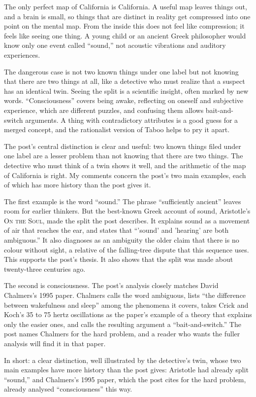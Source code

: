 \begin{afterword}
\summaryhead

The only perfect map of California is California. A useful map leaves things out, and a brain is small, so things that are distinct in reality get compressed into one point on the mental map. From the inside this does not feel like compression; it feels like seeing one thing. A young child or an ancient Greek philosopher would know only one event called ``sound,'' not acoustic vibrations and auditory experiences.

The dangerous case is not two known things under one label but not knowing that there are two things at all, like a detective who must realize that a suspect has an identical twin. Seeing the split is a scientific insight, often marked by new words. ``Consciousness'' covers being awake, reflecting on oneself and subjective experience, which are different puzzles, and confusing them allows bait-and-switch arguments. A thing with contradictory attributes is a good guess for a merged concept, and the rationalist version of Taboo helps to pry it apart.

\responsehead

The post's central distinction is clear and useful: two known things filed under one label are a lesser problem than not knowing that there are two things. The detective who must think of a twin shows it well, and the arithmetic of the map of California is right. My comments concern the post's two main examples, each of which has more history than the post gives it.

The first example is the word ``sound.'' The phrase ``sufficiently ancient'' leaves room for earlier thinkers. But the best-known Greek account of sound, Aristotle's \textsc{On the Soul}, made the split the post describes. It explains sound as a movement of air that reaches the ear, and states that ``'sound' and 'hearing' are both ambiguous.'' It also diagnoses as an ambiguity the older claim that there is no colour without sight, a relative of the falling-tree dispute that this sequence uses. This supports the post's thesis. It also shows that the split was made about twenty-three centuries ago.

The second is consciousness. The post's analysis closely matches David Chalmers's 1995 paper. Chalmers calls the word ambiguous, lists ``the difference between wakefulness and sleep'' among the phenomena it covers, takes Crick and Koch's 35 to 75 hertz oscillations as the paper's example of a theory that explains only the easier ones, and calls the resulting argument a ``bait-and-switch.'' The post names Chalmers for the hard problem, and a reader who wants the fuller analysis will find it in that paper.

In short: a clear distinction, well illustrated by the detective's twin, whose two main examples have more history than the post gives: Aristotle had already split ``sound,'' and Chalmers's 1995 paper, which the post cites for the hard problem, already analysed ``consciousness'' this way.
\end{afterword}
